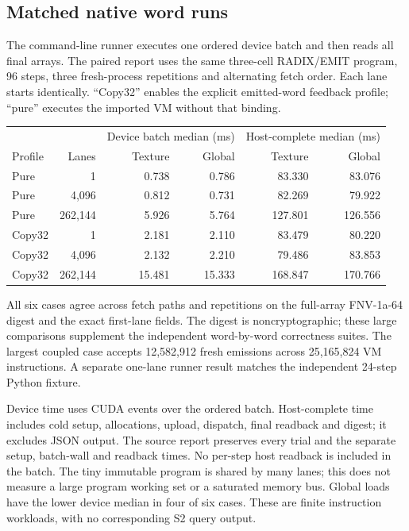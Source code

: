 \subsection{Matched native word runs}
The command-line runner executes one ordered device batch and then reads all
final arrays. The paired report uses the same three-cell RADIX/EMIT program,
96 steps, three fresh-process repetitions and alternating fetch order. Each
lane starts identically. ``Copy32'' enables the explicit emitted-word feedback
profile; ``pure'' executes the imported VM without that binding.

\begin{center}\small
\begin{tabular}{@{}l r r r r r@{}}
\toprule
 & & \multicolumn{2}{c}{Device batch median (ms)} &
\multicolumn{2}{c}{Host-complete median (ms)}\\
Profile & Lanes & Texture & Global & Texture & Global\\\midrule
Pure & 1 & 0.738 & 0.786 & 83.330 & 83.076\\
Pure & 4,096 & 0.812 & 0.731 & 82.269 & 79.922\\
Pure & 262,144 & 5.926 & 5.764 & 127.801 & 126.556\\
Copy32 & 1 & 2.181 & 2.110 & 83.479 & 80.220\\
Copy32 & 4,096 & 2.132 & 2.210 & 79.486 & 83.853\\
Copy32 & 262,144 & 15.481 & 15.333 & 168.847 & 170.766\\
\bottomrule
\end{tabular}\end{center}

All six cases agree across fetch paths and repetitions on the full-array
FNV-1a-64 digest and the exact first-lane fields. The digest is
noncryptographic; these large comparisons supplement the independent
word-by-word correctness suites. The largest coupled case accepts
12,582,912 fresh emissions across 25,165,824 VM instructions. A separate
one-lane runner result matches the independent 24-step Python fixture.

Device time uses CUDA events over the ordered batch. Host-complete time
includes cold setup, allocations, upload, dispatch, final readback and digest;
it excludes JSON output. The source report preserves every trial and the
separate setup, batch-wall and readback times. No per-step host readback is
included in the batch. The tiny immutable program is shared by many lanes;
this does not measure a large program working set or a saturated memory bus.
Global loads have the lower device median in four of six cases. These are
finite instruction workloads, with no corresponding S2 query output.

